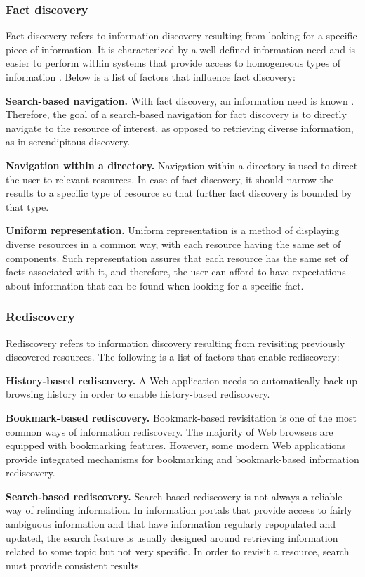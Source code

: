 \documentclass{casconpaper}
\begin{document}
{\subsubsection{Fact discovery}
Fact discovery refers to information discovery resulting from looking for a specific piece of information. It is characterized by a well-defined information need and is easier to perform within systems that provide access to homogeneous types of information \cite{kellar2006, lindley}. Below is a list of factors that influence fact discovery: 

\textbf{Search-based navigation.} With fact discovery, an information need is known \cite{kellar2006}. Therefore, the goal of a search-based navigation for fact discovery is to directly navigate to the resource of interest, as opposed to retrieving diverse information, as in serendipitous discovery.

\textbf{Navigation within a directory.} Navigation within a directory is used to direct the user to relevant resources. In case of fact discovery, it should narrow the results to a specific type of resource so that further fact discovery is bounded by that type. 

\textbf{Uniform representation.} Uniform representation is a method of displaying diverse resources in a common way, with each resource having the same set of components. Such representation assures that each resource has the same set of facts associated with it, and therefore, the user can afford to have expectations about information that can be found when looking for a specific fact.


} %

{\subsubsection{Rediscovery}
Rediscovery refers to information discovery resulting from revisiting previously discovered resources. The following is a list of factors that enable rediscovery:

\textbf{History-based rediscovery.} A Web application needs to automatically back up browsing history in order to enable history-based rediscovery.   

\textbf{Bookmark-based rediscovery.} Bookmark-based revisitation is one of the most common ways of information rediscovery. The majority of Web browsers are equipped with bookmarking features. However, some modern Web applications provide integrated mechanisms for bookmarking and bookmark-based information rediscovery.

\textbf{Search-based rediscovery.} Search-based rediscovery is not always a reliable way of refinding information. In information portals that provide access to fairly ambiguous information and that have information regularly repopulated and updated, the search feature is usually designed around retrieving information related to some topic but not very specific. In order to revisit a resource, search must provide consistent results.

} %
\end{document}
